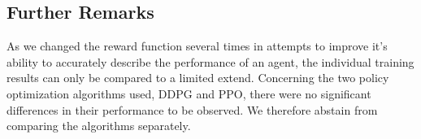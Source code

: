 \subsection{Further Remarks}
As we changed the reward function several times in attempts to improve it's ability to accurately describe the performance of an agent, the individual training results can only be compared to a limited extend.
Concerning the two policy optimization algorithms used, DDPG and PPO, there were no significant differences in their performance to be observed.
We therefore abstain from comparing the algorithms separately.



